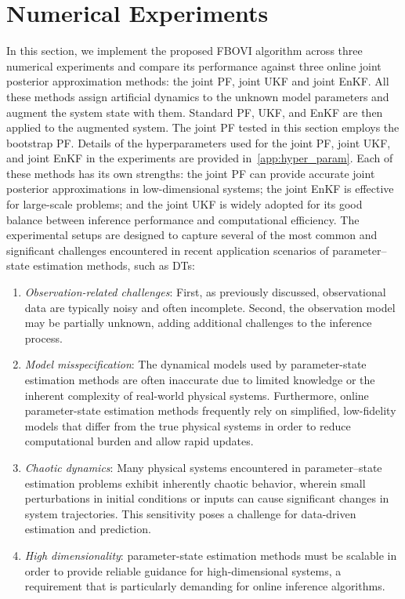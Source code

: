 \documentclass[preprint,3p,times]{elsarticle}
\begin{document}
\section{Numerical Experiments}
\label{sec:experiments}
In this section, we implement the proposed FBOVI algorithm across three numerical experiments and compare its performance against three online joint posterior approximation methods: the joint PF, joint UKF and joint EnKF. All these methods assign artificial dynamics to the unknown model parameters and augment the system state with them. Standard PF, UKF, and EnKF are then applied to the augmented system. The joint PF tested in this section employs the bootstrap PF. Details of the hyperparameters used for the joint PF, joint UKF, and joint EnKF in the experiments are provided in~\ref{app:hyper_param}. Each of these methods has its own strengths: the joint PF can provide accurate joint posterior approximations in low-dimensional systems; the joint EnKF is effective for large-scale problems; and the joint UKF is widely adopted for its good balance between inference performance and computational efficiency. The experimental setups are designed to capture several of the most common and significant challenges encountered in recent application scenarios of parameter–state estimation methods, such as DTs:
\begin{enumerate}
\item \textit{Observation-related challenges}: First, as previously discussed, observational data are typically noisy and often incomplete. Second, the observation model may be partially unknown, adding additional challenges to the inference process.
\item \textit{Model misspecification}: The dynamical models used by parameter-state estimation methods are often inaccurate due to limited knowledge or the inherent complexity of real-world physical systems. Furthermore, online parameter-state estimation methods frequently rely on simplified, low-fidelity models that differ from the true physical systems in order to reduce computational burden and allow rapid updates. 
\item \textit{Chaotic dynamics}: Many physical systems encountered in parameter–state estimation problems exhibit inherently chaotic behavior, wherein small perturbations in initial conditions or inputs can cause significant changes in system trajectories. This sensitivity poses a challenge for data-driven estimation and prediction.
\item \textit{High dimensionality}: parameter-state estimation methods must be scalable in order to provide reliable guidance for high-dimensional systems, a requirement that is particularly demanding for online inference algorithms.
\end{enumerate}
\end{document}
